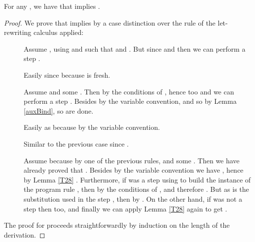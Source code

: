 For any ,  we have that  implies .
\begin{proof}\label{DEMO_LRwCerr}
We prove that  implies  by a case distinction over the rule of the let-rewriting calculus applied:
 \begin{description}
        \item[] Assume , using  and  such that  and . But since  and  then we can perform a  step .



        \item[] Easily since  because  is fresh.

        \item[] Assume  and some . Then  by the conditions of , hence  too and we can perform a  step . Besides  by the variable convention, and so  by Lemma \ref{auxBind}, so are done.

        \item[] Easily as  because  by the variable convention.

        \item[] Similar to the previous case since .

        \item[] Assume  because  by one of the previous rules, and some . Then we have already proved that . Besides by the variable convention we have , hence by Lemma \ref{T28} . Furthermore, if  was a  step using  to build the instance of the program rule , then  by the conditions of , and therefore . But as  is the substitution used in the  step , then  by . 
        On the other hand, if  was not a  step then  too, and finally we can apply Lemma \ref{T28} again to get .
\end{description}

The proof for  proceeds straightforwardly by induction on the length  of the derivation.
\end{proof}

